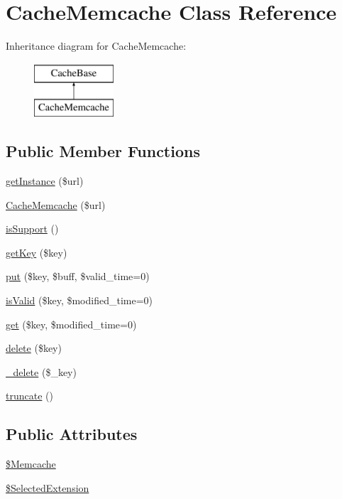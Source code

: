\hypertarget{classCacheMemcache}{\section{Cache\-Memcache Class Reference}
\label{classCacheMemcache}
}
Inheritance diagram for Cache\-Memcache\-:\begin{figure}[H]
\begin{center}
\leavevmode
\includegraphics[height=2.000000cm]{classCacheMemcache}
\end{center}
\end{figure}
\subsection*{Public Member Functions}
\begin{DoxyCompactItemize}
\item 
\hyperlink{classCacheMemcache_a951aa78ba49fdb971def3e2bb8b7db2e}{get\-Instance} (\$url)
\item 
\hyperlink{classCacheMemcache_ac4810e2e11716523e49df5a14b2fc215}{Cache\-Memcache} (\$url)
\item 
\hyperlink{classCacheMemcache_a4ea35bdd7cc26faa01996dbbc162720f}{is\-Support} ()
\item 
\hyperlink{classCacheMemcache_a27f400a936cc3efb152acc12edb379e1}{get\-Key} (\$key)
\item 
\hyperlink{classCacheMemcache_aaf8fbd3ad05138296cb522fe8c133017}{put} (\$key, \$buff, \$valid\-\_\-time=0)
\item 
\hyperlink{classCacheMemcache_af0882957fc5b20e7fb70aeae652920e8}{is\-Valid} (\$key, \$modified\-\_\-time=0)
\item 
\hyperlink{classCacheMemcache_a9a3db7b30c229677ce7c331aa41f9e9a}{get} (\$key, \$modified\-\_\-time=0)
\item 
\hyperlink{classCacheMemcache_aca057fd092e1a938410a20e16d2d2d7f}{delete} (\$key)
\item 
\hyperlink{classCacheMemcache_a8ac0c5d0703aaeaabec2c478984d43fa}{\-\_\-delete} (\$\-\_\-key)
\item 
\hyperlink{classCacheMemcache_a064b47c5872cde9ff686b148bf005849}{truncate} ()
\end{DoxyCompactItemize}
\subsection*{Public Attributes}
\begin{DoxyCompactItemize}
\item 
\hyperlink{classCacheMemcache_a56ac8c11dec3851aee654babe49d20f8}{\$\-Memcache}
\item 
\hyperlink{classCacheMemcache_aa555524556a771c296da72959be34e2d}{\$\-Selected\-Extension}
\end{DoxyCompactItemize}


